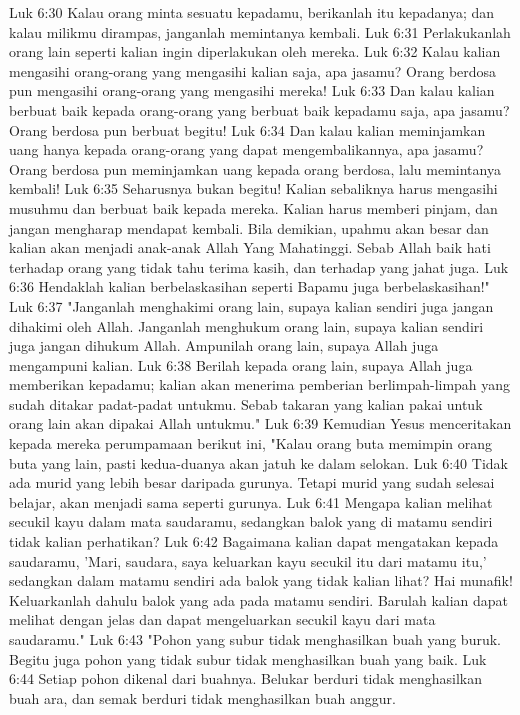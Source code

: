 Luk 6:30  Kalau orang minta sesuatu kepadamu, berikanlah itu kepadanya; dan kalau milikmu dirampas, janganlah memintanya kembali.
Luk 6:31  Perlakukanlah orang lain seperti kalian ingin diperlakukan oleh mereka.
Luk 6:32  Kalau kalian mengasihi orang-orang yang mengasihi kalian saja, apa jasamu? Orang berdosa pun mengasihi orang-orang yang mengasihi mereka!
Luk 6:33  Dan kalau kalian berbuat baik kepada orang-orang yang berbuat baik kepadamu saja, apa jasamu? Orang berdosa pun berbuat begitu!
Luk 6:34  Dan kalau kalian meminjamkan uang hanya kepada orang-orang yang dapat mengembalikannya, apa jasamu? Orang berdosa pun meminjamkan uang kepada orang berdosa, lalu memintanya kembali!
Luk 6:35  Seharusnya bukan begitu! Kalian sebaliknya harus mengasihi musuhmu dan berbuat baik kepada mereka. Kalian harus memberi pinjam, dan jangan mengharap mendapat kembali. Bila demikian, upahmu akan besar dan kalian akan menjadi anak-anak Allah Yang Mahatinggi. Sebab Allah baik hati terhadap orang yang tidak tahu terima kasih, dan terhadap yang jahat juga.
Luk 6:36  Hendaklah kalian berbelaskasihan seperti Bapamu juga berbelaskasihan!"
Luk 6:37  "Janganlah menghakimi orang lain, supaya kalian sendiri juga jangan dihakimi oleh Allah. Janganlah menghukum orang lain, supaya kalian sendiri juga jangan dihukum Allah. Ampunilah orang lain, supaya Allah juga mengampuni kalian.
Luk 6:38  Berilah kepada orang lain, supaya Allah juga memberikan kepadamu; kalian akan menerima pemberian berlimpah-limpah yang sudah ditakar padat-padat untukmu. Sebab takaran yang kalian pakai untuk orang lain akan dipakai Allah untukmu."
Luk 6:39  Kemudian Yesus menceritakan kepada mereka perumpamaan berikut ini, "Kalau orang buta memimpin orang buta yang lain, pasti kedua-duanya akan jatuh ke dalam selokan.
Luk 6:40  Tidak ada murid yang lebih besar daripada gurunya. Tetapi murid yang sudah selesai belajar, akan menjadi sama seperti gurunya.
Luk 6:41  Mengapa kalian melihat secukil kayu dalam mata saudaramu, sedangkan balok yang di matamu sendiri tidak kalian perhatikan?
Luk 6:42  Bagaimana kalian dapat mengatakan kepada saudaramu, 'Mari, saudara, saya keluarkan kayu secukil itu dari matamu itu,' sedangkan dalam matamu sendiri ada balok yang tidak kalian lihat? Hai munafik! Keluarkanlah dahulu balok yang ada pada matamu sendiri. Barulah kalian dapat melihat dengan jelas dan dapat mengeluarkan secukil kayu dari mata saudaramu."
Luk 6:43  "Pohon yang subur tidak menghasilkan buah yang buruk. Begitu juga pohon yang tidak subur tidak menghasilkan buah yang baik.
Luk 6:44  Setiap pohon dikenal dari buahnya. Belukar berduri tidak menghasilkan buah ara, dan semak berduri tidak menghasilkan buah anggur.
